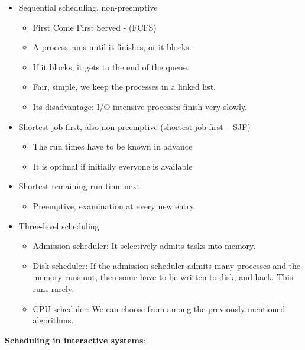 \documentclass[margin=0px]{article}
\begin{document}
\begin{itemize}
    \item Sequential scheduling, non-preemptive
          \begin{itemize}
              \item First Come First Served - (FCFS)
              \item A process runs until it finishes, or it blocks.
              \item If it blocks, it gets to the end of the queue.
              \item Fair, simple, we keep the processes in a linked list.
              \item Its disadvantage: I/O-intensive processes finish very slowly.
          \end{itemize}
    \item Shortest job first, also non-preemptive (shortest job first -- SJF)
          \begin{itemize}
              \item The run times have to be known in advance
              \item It is optimal if initially everyone is available
          \end{itemize}
    \item Shortest remaining run time next
          \begin{itemize}
              \item Preemptive, examination at every new entry.
          \end{itemize}
    \item Three-level scheduling
          \begin{itemize}
              \item Admission scheduler: It selectively admits tasks into memory.
              \item Disk scheduler: If the admission scheduler admits many processes and the memory runs out, then some have to be written to disk, and back. This runs rarely.
              \item CPU scheduler: We can choose from among the previously mentioned algorithms.
          \end{itemize}
\end{itemize}
\textbf{Scheduling in interactive systems}:
\end{document}
